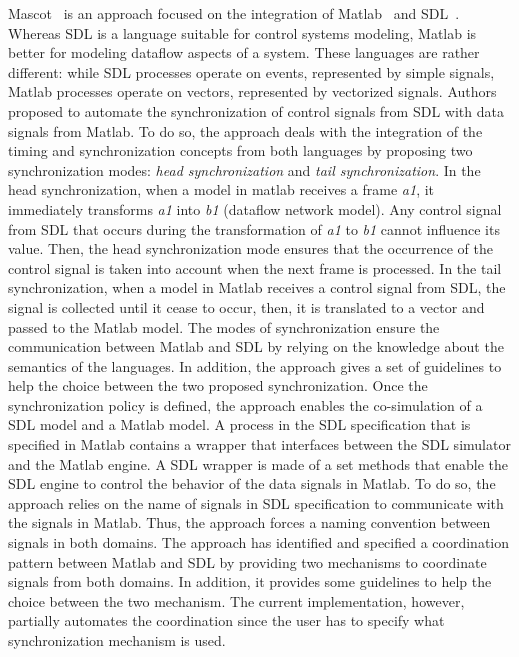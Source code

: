 Mascot~\cite{mascotbib} is an approach focused on the integration of Matlab~\cite{matlabbib} and SDL~\cite{sdlbib}. Whereas SDL is a language suitable for control systems modeling, Matlab is better for modeling dataflow aspects of a system. These languages are rather different: while SDL processes operate on events, represented by simple signals, Matlab processes operate on vectors, represented by vectorized signals. Authors proposed to automate the synchronization of control signals from SDL with data signals from Matlab. To do so, the approach deals with the integration of the timing and synchronization concepts from both languages by proposing two synchronization modes: \emph{head synchronization} and \emph{tail synchronization}. In the head synchronization, when a model in matlab receives a frame \emph{a1}, it immediately transforms \emph{a1} into \emph{b1} (dataflow network model). Any control signal from SDL that occurs during the transformation of \emph{a1} to \emph{b1} cannot influence its value. Then, the head synchronization mode ensures that the occurrence of the control signal is taken into account when the next frame is processed. In the tail synchronization, when a model in Matlab receives a control signal from SDL, the signal is collected until it cease to occur, then, it is translated to a vector and passed to the Matlab model. The modes of synchronization ensure the communication between Matlab and SDL by relying on the knowledge about the semantics of the languages. In addition, the approach gives a set of guidelines to help the choice between the two proposed synchronization. Once the synchronization policy is defined, the approach enables the co-simulation of a SDL model and a Matlab model. A process in the SDL specification that is specified in Matlab contains a wrapper that interfaces between the SDL simulator and the Matlab engine. A SDL wrapper is made of a set methods that enable the SDL engine to control the behavior of the data signals in Matlab. To do so, the approach relies on the name of signals in SDL specification to communicate with the signals in Matlab. Thus, the approach forces a naming convention between signals in both domains. The approach has identified and specified a coordination pattern between Matlab and SDL by providing two mechanisms to coordinate signals from both domains. In addition, it provides some guidelines to help the choice between the two mechanism. The current implementation, however, partially automates the coordination since the user has to specify what synchronization mechanism is used.

